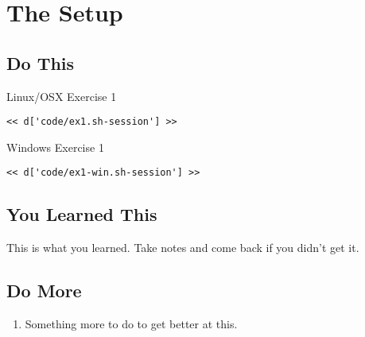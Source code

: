 \chapter{The Setup}

\section{Do This}

\begin{code}{Linux/OSX Exercise 1}
\begin{Verbatim}
<< d['code/ex1.sh-session'] >>
\end{Verbatim}
\end{code}

\begin{code}{Windows Exercise 1}
\begin{Verbatim}
<< d['code/ex1-win.sh-session'] >>
\end{Verbatim}
\end{code}

\section{You Learned This}

This is what you learned.  Take notes and come back if you didn't get it.

\section{Do More}

\begin{enumerate}
\item Something more to do to get better at this.
\end{enumerate}


